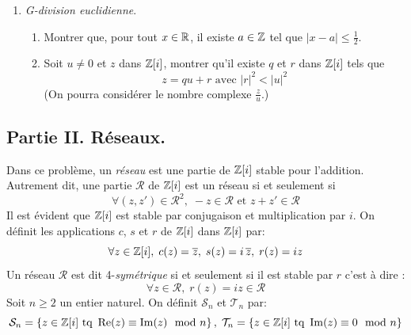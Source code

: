 \begin{enumerate}
\item \emph{G-division euclidienne}.
\begin{enumerate}
  \item Montrer que, pour tout $x\in \mathbb{R}$, il existe $a\in \mathbb{Z}$ tel que $|x-a|\leq \frac{1}{2}$.
  \item Soit $u\neq 0$ et $z$ dans $\mathbb{Z}[i]$, montrer qu'il existe $q$ et $r$ dans $\mathbb{Z}[i]$ tels que 
\begin{displaymath}
  z = q u + r\text{ avec } |r|^2 < |u|^2
\end{displaymath}
(On pourra considérer le nombre complexe $\frac{z}{u}$.)
\end{enumerate}
\end{enumerate}


\subsection*{Partie II. Réseaux.}
Dans ce problème, un \emph{réseau} est une partie de $\mathbb{Z}[i]$ stable pour l'addition. Autrement dit, une partie $\mathcal{R}$ de $\mathbb{Z}[i]$ est un réseau si et seulement si
\begin{displaymath}
  \forall (z,z')\in \mathcal{R}^2,\; -z\in \mathcal{R} \text{ et } z+z' \in \mathcal{R}
\end{displaymath}
Il est évident que $\mathbb{Z}[i]$ est stable par conjugaison et multiplication par $i$. On définit les applications $c$, $s$ et $r$ de $\mathbb{Z}[i]$ dans $\mathbb{Z}[i]$ par:
\begin{displaymath}
  \forall z \in \mathbb{Z}[i],\; c(z) = \overline{z},\; s(z) = i\,\overline{z},\; r(z) = iz
\end{displaymath}
Un réseau $\mathcal{R}$ est dit 4-\emph{symétrique} si et seulement si il est stable par $r$ c'est à dire :
\begin{displaymath}
  \forall z\in \mathcal{R},\; r(z) = iz \in \mathcal{R}
\end{displaymath}
Soit $n\geq 2$ un entier naturel. On définit $\mathcal{S}_n$ et $\mathcal{T}_n$ par:
\begin{displaymath}
  \mathcal{S}_n = \left\lbrace z\in \mathbb{Z}[i] \text{ tq } \operatorname{Re}(z) \equiv \operatorname{Im}(z) \mod n\right\rbrace ,
\;
  \mathcal{T}_n = \left\lbrace z\in \mathbb{Z}[i] \text{ tq } \operatorname{Im}(z) \equiv 0 \mod n\right\rbrace 
\end{displaymath}

